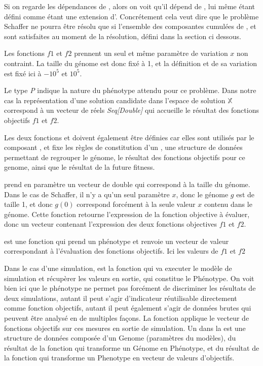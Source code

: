 Si on regarde les dépendances de , alors on voit qu'il dépend de , lui même étant défini comme étant une extension d'. Concrétement cela veut dire que le problème Schaffer ne pourra être résolu que si l'ensemble des composantes cumulées de  ,  et  sont satisfaites au moment de la résolution, défini dans la section ci dessous.

Les fonctions $f1$ et $f2$ prennent un seul et même paramètre de variation $x$ non contraint. La taille  du génome est donc fixé à 1, et la définition  et  de sa variation est fixé ici à $-10^{5}$ et $10^{5}$.

Le type \emph{P} indique la nature du phénotype attendu pour ce problème. Dans notre cas la représentation d'une solution candidate dans l'espace de solution $\mathbb{X}$ correspond à un vecteur de réels \emph{Seq[Double]} qui accueille le résultat des fonctions objectifs $f1$ et $f2$.

Les deux fonctions  et  doivent également être définies car elles sont utilisés par le composant , et fixe les règles de constitution d'un , une structure de données permettant de regrouper le génome, le résultat des fonctions objectifs pour ce genome, ainsi que le résultat de la future fitness.

\begin{itemize}[label=\textbullet, noitemsep, topsep=0pt, parsep=0pt, partopsep=0pt]
 prend en paramètre un vecteur de double qui correspond à la taille du génome. Dans le cas de Schaffer, il n'y a qu'un seul paramètre $x$, donc le génome $g$ est de taille 1, et donc $g(0)$ correspond forcément à la seule valeur $x$ contenu dans le génome. Cette fonction retourne l'expression de la fonction objective à évaluer, donc un vecteur contenant l'expression des deux fonctions objectives $f1$ et $f2$.

 est une fonction qui prend un phénotype et renvoie un vecteur de valeur correspondant à l'évaluation des fonctions objectifs. Ici les valeurs de $f1$ et $f2$

\end{itemize}

Dans le cas d'une simulation,  est la fonction qui va executer le modèle de simulation et récupèrer les valeurs en sortie, qui constitue le Phénotype. On voit bien ici que le phénotype ne permet pas forcément de discriminer les résultats de deux simulations, autant il peut s'agir d'indicateur réutilisable directement comme fonction objectifs, autant il peut également s'agir de données brutes qui peuvent être analysé en de multiples façons.  La fonction  applique le vecteur de fonctions objectifs sur ces mesures en sortie de simulation. Un  dans la  est une structure de données composée d'un Genome (paramètres du modèles), du résultat de la fonction  qui transforme un Génome en Phénotype, et du résultat de la fonction  qui transforme un Phenotype en vecteur de valeurs d'objectifs.

